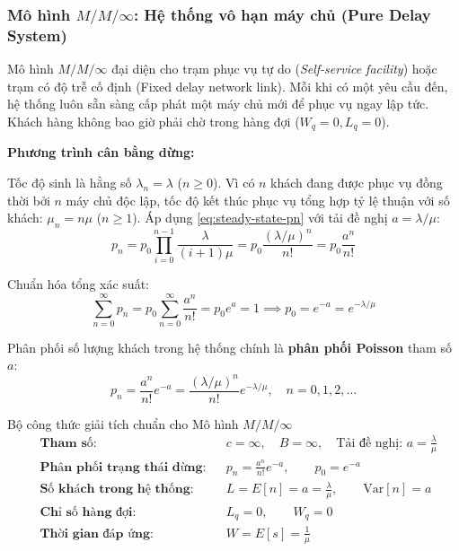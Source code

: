 \subsubsection{Mô hình \texorpdfstring{$M/M/\infty$}{M/M/inf}: Hệ thống vô hạn máy chủ (Pure Delay System)}

\hspace{0.5cm}Mô hình $M/M/\infty$ đại diện cho trạm phục vụ tự do (\textit{Self-service facility}) hoặc trạm có độ trễ cố định (Fixed delay network link). Mỗi khi có một yêu cầu đến, hệ thống luôn sẵn sàng cấp phát một máy chủ mới để phục vụ ngay lập tức. Khách hàng không bao giờ phải chờ trong hàng đợi ($W_q = 0, L_q = 0$).

\textbf{Phương trình cân bằng dừng:}

Tốc độ sinh là hằng số $\lambda_n = \lambda$ ($n \ge 0$). Vì có $n$ khách đang được phục vụ đồng thời bởi $n$ máy chủ độc lập, tốc độ kết thúc phục vụ tổng hợp tỷ lệ thuận với số khách: $\mu_n = n\mu$ ($n \ge 1$). Áp dụng \eqref{eq:steady-state-pn} với tải đề nghị $a = \lambda / \mu$:
\begin{equation}
    p_n = p_0 \prod_{i=0}^{n-1} \frac{\lambda}{(i+1)\mu} = p_0 \frac{(\lambda/\mu)^n}{n!} = p_0 \frac{a^n}{n!}
\end{equation}

Chuẩn hóa tổng xác suất:
\begin{equation}
    \sum_{n=0}^\infty p_n = p_0 \sum_{n=0}^\infty \frac{a^n}{n!} = p_0 e^a = 1 \implies p_0 = e^{-a} = e^{-\lambda/\mu}
\end{equation}

Phân phối số lượng khách trong hệ thống chính là \textbf{phân phối Poisson} tham số $a$:
\begin{equation}
    p_n = \frac{a^n}{n!} e^{-a} = \frac{(\lambda/\mu)^n}{n!} e^{-\lambda/\mu}, \quad n = 0, 1, 2, \dots
\end{equation}

\begin{modelbox}{Bộ công thức giải tích chuẩn cho Mô hình $M/M/\infty$}
\begin{align*}
    &\textbf{Tham số:} && c = \infty, \quad B = \infty, \quad \text{Tải đề nghị: } a = \frac{\lambda}{\mu} \\[4pt]
    &\textbf{Phân phối trạng thái dừng:} && p_n = \frac{a^n}{n!} e^{-a}, \qquad p_0 = e^{-a} \\[4pt]
    &\textbf{Số khách trong hệ thống:} && L = E[n] = a = \frac{\lambda}{\mu}, \qquad \text{Var}[n] = a \\[4pt]
    &\textbf{Chỉ số hàng đợi:} && L_q = 0, \qquad W_q = 0 \\[4pt]
    &\textbf{Thời gian đáp ứng:} && W = E[s] = \frac{1}{\mu}
\end{align*}
\end{modelbox}

